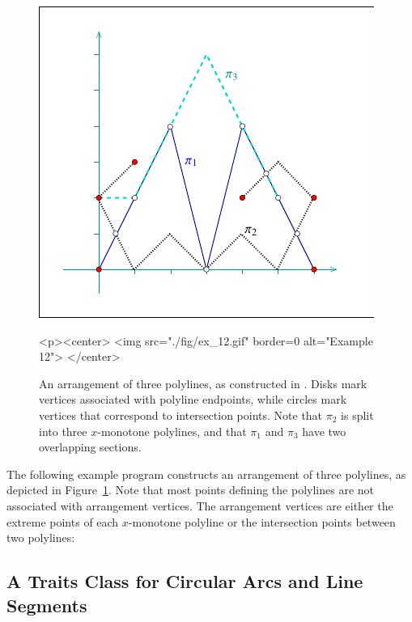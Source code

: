\begin{figure}[t]
\begin{ccTexOnly}
  \begin{center}
  \includegraphics{Arrangement_on_surface_2/fig/ex_12}
  \end{center}
\end{ccTexOnly}
\begin{ccHtmlOnly}
  <p><center>
  <img src="./fig/ex_12.gif" border=0 alt="Example 12">
  </center>
\end{ccHtmlOnly}
\caption{An arrangement of three polylines, as constructed in
. Disks mark vertices associated with
polyline endpoints, while circles mark vertices that correspond
to intersection points. Note that $\pi_2$ is split into three
$x$-monotone polylines, and that $\pi_1$ and $\pi_3$ have two
overlapping sections.\label{arr_fig:ex_12}}
\end{figure}

The following example program constructs an arrangement of three
polylines, as depicted in Figure~\ref{arr_fig:ex_12}. Note that
most points defining the polylines are not associated with arrangement
vertices. The arrangement vertices are either the extreme points of
each $x$-monotone polyline or the intersection points between two
polylines:


\subsection{A Traits Class for Circular Arcs and Line Segments\label{arr_ssec:tr_circ_seg}}

